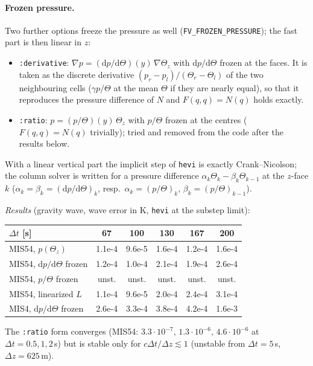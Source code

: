 \documentclass[11pt,a4paper]{article}
\newcommand{\code}[1]{\texttt{#1}}
\newcommand{\dt}{\Delta t}
\begin{document}
\paragraph{Frozen pressure.} Two further options freeze the pressure as well
(\code{FV\_FROZEN\_PRESSURE}); the fast part is then linear in $z$:
\begin{itemize}
\item \code{:derivative}: $\nabla p = (\mathrm dp/\mathrm d\Theta)(y)\,\nabla\Theta_z$ with
  $\mathrm dp/\mathrm d\Theta$ frozen at the faces. It is taken as the discrete derivative
  $(p_r-p_l)/(\Theta_r-\Theta_l)$ of the two neighbouring cells ($\gamma p/\Theta$ at the mean
  $\Theta$ if they are nearly equal), so that it reproduces the pressure difference of $N$ and
  $F(q,q)=N(q)$ holds exactly.
\item \code{:ratio}: $p = (p/\Theta)(y)\,\Theta_z$ with $p/\Theta$ frozen at the centres
  ($F(q,q)=N(q)$ trivially); tried and removed from the code after the results below.
\end{itemize}
With a linear vertical part the implicit step of \code{hevi} is exactly Crank--Nicolson; the column
solver is written for a pressure difference $\alpha_k\Theta_k-\beta_k\Theta_{k-1}$ at the $z$-face
$k$ ($\alpha_k=\beta_k=(\mathrm dp/\mathrm d\Theta)_k$, resp.\ $\alpha_k=(p/\Theta)_k$,
$\beta_k=(p/\Theta)_{k-1}$).

\emph{Results} (gravity wave, wave error in K, \code{hevi} at the substep limit):
\begin{center}
\begin{tabular}{lccccc}
\toprule
$\dt$ [s] & 67 & 100 & 130 & 167 & 200\\
\midrule
MIS54, $p(\Theta_z)$ & 1.1e-4 & 9.6e-5 & 1.6e-4 & 1.2e-4 & 1.6e-4\\
MIS54, $\mathrm dp/\mathrm d\Theta$ frozen & 1.2e-4 & 1.0e-4 & 2.1e-4 & 1.9e-4 & 2.6e-4\\
MIS54, $p/\Theta$ frozen & unst. & unst. & unst. & unst. & unst.\\
MIS54, linearized $L$ & 1.1e-4 & 9.6e-5 & 2.0e-4 & 2.4e-4 & 3.1e-4\\
MIS4, $\mathrm dp/\mathrm d\Theta$ frozen & 2.6e-4 & 3.3e-4 & 3.8e-4 & 4.2e-4 & 1.6e-3\\
\bottomrule
\end{tabular}
\end{center}
The \code{:ratio} form converges (MIS54: $3.3\cdot10^{-7}$, $1.3\cdot10^{-6}$, $4.6\cdot10^{-6}$ at
$\dt=0.5,1,2$\,s) but is stable only for $c\dt/\Delta z\lesssim1$ (unstable from $\dt=5$\,s, $\Delta z=625$\,m).
\end{document}
